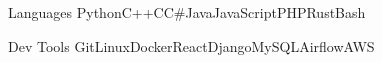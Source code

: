 \begin{siderules}


\begin{cvskills}


\cvskill
{Languages} %
{Python{\enskip\cdotp\enskip}C++{\enskip\cdotp\enskip}C{\enskip\cdotp\enskip}C\#{\enskip\cdotp\enskip}Java{\enskip\cdotp\enskip}JavaScript{\enskip\cdotp\enskip}PHP{\enskip\cdotp\enskip}Rust{\enskip\cdotp\enskip}Bash} %


\cvskill
{Dev Tools} 
{Git{\enskip\cdotp\enskip}Linux{\enskip\cdotp\enskip}Docker{\enskip\cdotp\enskip}React{\enskip\cdotp\enskip}Django{\enskip\cdotp\enskip}MySQL{\enskip\cdotp\enskip}Airflow{\enskip\cdotp\enskip}AWS} 





\end{cvskills}
\end{siderules}